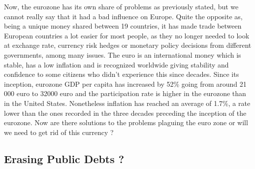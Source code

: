 \documentclass[12pt]{article}
\begin{document}
Now, the eurozone has its own share of problems as previously stated, but we cannot really say that it had a bad influence on Europe. Quite the opposite as, being a unique money shared between 19 countries, it has made trade between European countries a lot easier for most people, as they no longer needed to look at exchange rate, currency risk hedges or monetary policy decisions from different governments, among many issues.
The euro is an international money which is stable, has a low inflation and is recognized worldwide giving stability and confidence to some citizens who didn’t experience this since decades. Since its inception, eurozone GDP per capita has increased by 52\% going from around 21 000 euro to 32000 euro and the participation rate is higher in the eurozone than in the United States. Nonetheless inflation has reached an average of 1.7\%, a rate lower than the ones recorded in the three decades preceding the inception of the eurozone.  
Now are there solutions to the problems plaguing the euro zone or will we need to get rid of this currency ?

\subsection{Erasing Public Debts ?}
\end{document}
